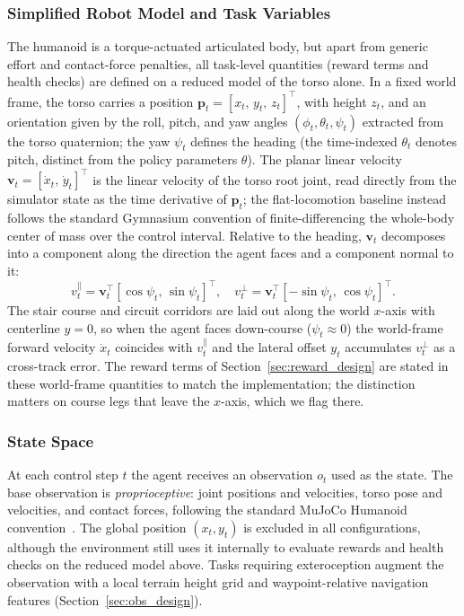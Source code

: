 \documentclass[conference,a4paper]{IEEEtran}
\begin{document}
\subsubsection{Simplified Robot Model and Task Variables}
\label{sec:robot_model}
The humanoid is a torque-actuated articulated body, but apart from generic effort and contact-force penalties, all task-level quantities (reward terms and health checks) are defined on a reduced model of the torso alone. In a fixed world frame, the torso carries a position $\mathbf{p}_t = [x_t,\, y_t,\, z_t]^{\top}$, with height $z_t$, and an orientation given by the roll, pitch, and yaw angles $(\phi_t, \theta_t, \psi_t)$ extracted from the torso quaternion; the yaw $\psi_t$ defines the heading (the time-indexed $\theta_t$ denotes pitch, distinct from the policy parameters $\theta$). The planar linear velocity $\mathbf{v}_t = [\dot{x}_t,\, \dot{y}_t]^{\top}$ is the linear velocity of the torso root joint, read directly from the simulator state as the time derivative of $\mathbf{p}_t$; the flat-locomotion baseline instead follows the standard Gymnasium convention of finite-differencing the whole-body center of mass over the control interval. Relative to the heading, $\mathbf{v}_t$ decomposes into a component along the direction the agent faces and a component normal to it:
\begin{equation}
\label{eq:heading_decomp}
v_t^{\parallel} = \mathbf{v}_t^{\top} [\cos\psi_t,\, \sin\psi_t]^{\top}, \quad
v_t^{\perp} = \mathbf{v}_t^{\top} [-\sin\psi_t,\, \cos\psi_t]^{\top}.
\end{equation}
The stair course and circuit corridors are laid out along the world $x$-axis with centerline $y{=}0$, so when the agent faces down-course ($\psi_t \approx 0$) the world-frame forward velocity $\dot{x}_t$ coincides with $v_t^{\parallel}$ and the lateral offset $y_t$ accumulates $v_t^{\perp}$ as a cross-track error. The reward terms of Section~\ref{sec:reward_design} are stated in these world-frame quantities to match the implementation; the distinction matters on course legs that leave the $x$-axis, which we flag there.

\subsubsection{State Space}
At each control step $t$ the agent receives an observation $o_t$ used as the state. The base observation is \emph{proprioceptive}: joint positions and velocities, torso pose and velocities, and contact forces, following the standard MuJoCo Humanoid convention~\cite{towers2024gymnasium}. The global position $(x_t, y_t)$ is excluded in all configurations, although the environment still uses it internally to evaluate rewards and health checks on the reduced model above. Tasks requiring exteroception augment the observation with a local terrain height grid and waypoint-relative navigation features (Section~\ref{sec:obs_design}).
\end{document}
